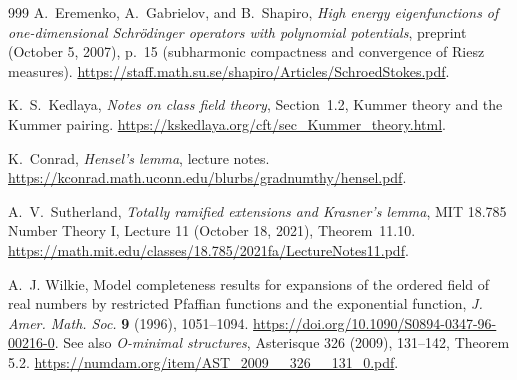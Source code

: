 \documentclass[11pt,a4paper]{article}
\theoremstyle{definition}
\theoremstyle{remark}
\numberwithin{equation}{section}
\begin{document}
\begin{thebibliography}{999}
A.~Eremenko, A.~Gabrielov, and B.~Shapiro,
\emph{High energy eigenfunctions of one-dimensional Schr\"odinger operators
with polynomial potentials}, preprint (October 5, 2007), p.~15
(subharmonic compactness and convergence of Riesz measures).
\url{https://staff.math.su.se/shapiro/Articles/SchroedStokes.pdf}.

K.~S.~Kedlaya, \emph{Notes on class field theory}, Section~1.2,
Kummer theory and the Kummer pairing.
\url{https://kskedlaya.org/cft/sec_Kummer_theory.html}.

K.~Conrad, \emph{Hensel's lemma}, lecture notes.
\url{https://kconrad.math.uconn.edu/blurbs/gradnumthy/hensel.pdf}.

A.~V.~Sutherland,
\emph{Totally ramified extensions and Krasner's lemma},
MIT 18.785 Number Theory I, Lecture 11 (October 18, 2021),
Theorem~11.10.
\url{https://math.mit.edu/classes/18.785/2021fa/LectureNotes11.pdf}.

A.~J. Wilkie, Model completeness results for expansions of the ordered field of real numbers by restricted Pfaffian functions and the exponential function, \emph{J. Amer. Math. Soc.} \textbf{9} (1996), 1051--1094. \url{https://doi.org/10.1090/S0894-0347-96-00216-0}. See also \emph{O-minimal structures}, Asterisque 326 (2009), 131--142, Theorem 5.2. \url{https://numdam.org/item/AST_2009__326__131_0.pdf}.

\end{thebibliography}
\end{document}
